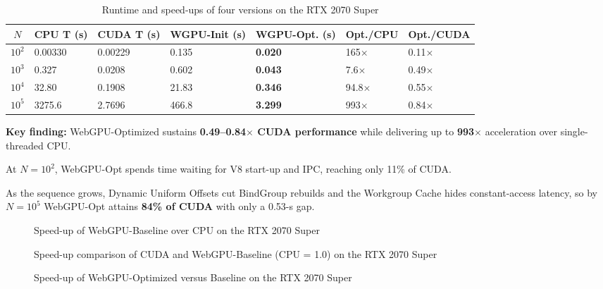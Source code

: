 \documentclass[12pt]{report}
\begin{document}
\begin{table}[h]
    \centering
    \begin{tabularx}{\textwidth}{|c|X|X|X|X|X|X|}
        \hline
        $N$ & CPU T (s) & CUDA T (s) & WGPU-Init (s) & \textbf{WGPU-Opt. (s)} & Opt./CPU & Opt./CUDA \\
        \hline
        $10^2$ & 0.00330 & 0.00229 & 0.135 & \textbf{0.020} & 165$\times$ & 0.11$\times$ \\
        $10^3$ & 0.327 & 0.0208 & 0.602 & \textbf{0.043} & 7.6$\times$ & 0.49$\times$ \\
        $10^4$ & 32.80 & 0.1908 & 21.83 & \textbf{0.346} & 94.8$\times$ & 0.55$\times$ \\
        $10^5$ & 3275.6 & 2.7696 & 466.8 & \textbf{3.299} & 993$\times$ & 0.84$\times$ \\
        \hline
    \end{tabularx}
    \caption{Runtime and speed-ups of four versions on the RTX 2070 Super}
    \label{tab:rtx_performance}
\end{table}

\textbf{Key finding:} WebGPU-Optimized sustains \textbf{0.49–0.84$\times$ CUDA performance} while delivering up to \textbf{993$\times$} acceleration over single-threaded CPU.

At $N=10^2$, WebGPU-Opt spends time waiting for V8 start-up and IPC, reaching only 11\% of CUDA.

As the sequence grows, Dynamic Uniform Offsets cut BindGroup rebuilds and the Workgroup Cache hides constant-access latency, so by $N=10^5$ WebGPU-Opt attains \textbf{84\% of CUDA} with only a 0.53-s gap.

\begin{figure}[h]
    \caption{Speed-up of WebGPU-Baseline over CPU on the RTX 2070 Super}
    \label{fig:2070s-1}
\end{figure}

\begin{figure}[h]
    \caption{Speed-up comparison of CUDA and WebGPU-Baseline (CPU = 1.0) on the RTX 2070 Super}
    \label{fig:2070s-3}
\end{figure}

\begin{figure}[h]
    \caption{Speed-up of WebGPU-Optimized versus Baseline on the RTX 2070 Super}
    \label{fig:2070s-2}
\end{figure}
\end{document}

